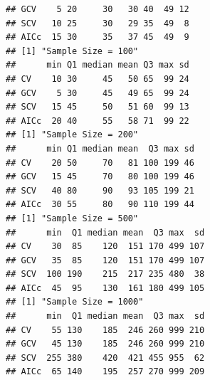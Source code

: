 \documentclass{article}
\makeatletter
\newenvironment{kframe}{%
 \def\FrameCommand##1{\hskip\@totalleftmargin \hskip-\fboxsep
 \colorbox{shadecolor}{##1}\hskip-\fboxsep
     \hskip-\linewidth \hskip-\@totalleftmargin \hskip\columnwidth}%
 \MakeFramed {\advance\hsize-\width
   \@totalleftmargin\z@ \linewidth\hsize
   \@setminipage}}%
 {\par\unskip\endMakeFramed}
\newenvironment{knitrout}{}{} %
\makeatother
\begin{document}
\begin{knitrout}
\begin{kframe}
\begin{verbatim}
## GCV    5 20     30   30 40  49 12
## SCV   10 25     30   29 35  49  8
## AICc  15 30     35   37 45  49  9
## [1] "Sample Size = 100"
##      min Q1 median mean Q3 max sd
## CV    10 30     45   50 65  99 24
## GCV    5 30     45   49 65  99 24
## SCV   15 45     50   51 60  99 13
## AICc  20 40     55   58 71  99 22
## [1] "Sample Size = 200"
##      min Q1 median mean  Q3 max sd
## CV    20 50     70   81 100 199 46
## GCV   15 45     70   80 100 199 46
## SCV   40 80     90   93 105 199 21
## AICc  30 55     80   90 110 199 44
## [1] "Sample Size = 500"
##      min  Q1 median mean  Q3 max  sd
## CV    30  85    120  151 170 499 107
## GCV   35  85    120  151 170 499 107
## SCV  100 190    215  217 235 480  38
## AICc  45  95    130  161 180 499 105
## [1] "Sample Size = 1000"
##      min  Q1 median mean  Q3 max  sd
## CV    55 130    185  246 260 999 210
## GCV   45 130    185  246 260 999 210
## SCV  255 380    420  421 455 955  62
## AICc  65 140    195  257 270 999 209
\end{verbatim}
\end{kframe}
\end{knitrout}
\end{document}
